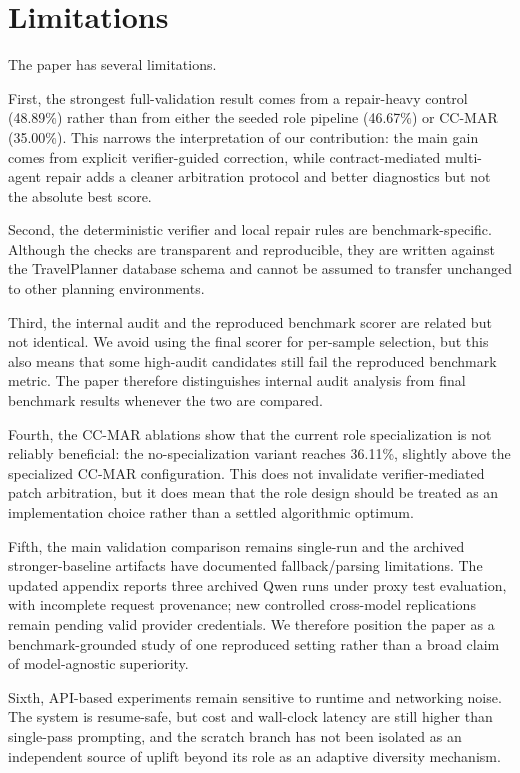 \documentclass{article}
\begin{document}
\section{Limitations}
The paper has several limitations.

First, the strongest full-validation result comes from a repair-heavy control (48.89\%) rather than from either the seeded role pipeline (46.67\%) or CC-MAR (35.00\%). This narrows the interpretation of our contribution: the main gain comes from explicit verifier-guided correction, while contract-mediated multi-agent repair adds a cleaner arbitration protocol and better diagnostics but not the absolute best score.

Second, the deterministic verifier and local repair rules are benchmark-specific. Although the checks are transparent and reproducible, they are written against the TravelPlanner database schema and cannot be assumed to transfer unchanged to other planning environments.

Third, the internal audit and the reproduced benchmark scorer are related but not identical. We avoid using the final scorer for per-sample selection, but this also means that some high-audit candidates still fail the reproduced benchmark metric. The paper therefore distinguishes internal audit analysis from final benchmark results whenever the two are compared.

Fourth, the CC-MAR ablations show that the current role specialization is not reliably beneficial: the no-specialization variant reaches 36.11\%, slightly above the specialized CC-MAR configuration. This does not invalidate verifier-mediated patch arbitration, but it does mean that the role design should be treated as an implementation choice rather than a settled algorithmic optimum.

Fifth, the main validation comparison remains single-run and the archived stronger-baseline artifacts have documented fallback/parsing limitations. The updated appendix reports three archived Qwen runs under proxy test evaluation, with incomplete request provenance; new controlled cross-model replications remain pending valid provider credentials. We therefore position the paper as a benchmark-grounded study of one reproduced setting rather than a broad claim of model-agnostic superiority.

Sixth, API-based experiments remain sensitive to runtime and networking noise. The system is resume-safe, but cost and wall-clock latency are still higher than single-pass prompting, and the scratch branch has not been isolated as an independent source of uplift beyond its role as an adaptive diversity mechanism.
\end{document}
